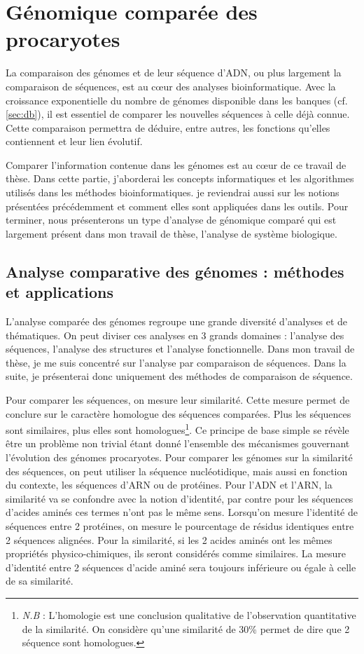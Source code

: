 \chapter{Génomique comparée des procaryotes}
\label{chap:comp}

La comparaison des génomes et de leur séquence d'ADN, ou plus largement la comparaison de séquences, est au c\oe ur des analyses bioinformatique. Avec la croissance exponentielle du nombre de génomes disponible dans les banques (cf. \autoref{sec:db}), il est essentiel de comparer les nouvelles séquences à celle déjà connue. Cette comparaison permettra de déduire, entre autres, les fonctions qu'elles contiennent et leur lien évolutif. 

Comparer l'information contenue dans les génomes est au c\oe ur de ce travail de thèse. Dans cette partie, j'aborderai les concepts informatiques et les algorithmes utilisés dans les méthodes bioinformatiques. je reviendrai aussi sur les notions présentées précédemment et comment elles sont appliquées dans les outils. Pour terminer, nous présenterons un type d'analyse de génomique comparé qui est largement présent dans mon travail de thèse, l'analyse de système biologique.

\section{Analyse comparative des génomes : méthodes et applications}
\label{sec:comp_gen}

L'analyse comparée des génomes regroupe une grande diversité d'analyses et de thématiques. On peut diviser ces analyses en 3 grands domaines : l'analyse des séquences, l'analyse des structures et l'analyse fonctionnelle. Dans mon travail de thèse, je me suis concentré sur l'analyse par comparaison de séquences. Dans la suite, je présenterai donc uniquement des méthodes de comparaison de séquence.

Pour comparer les séquences, on mesure leur similarité. Cette mesure permet de conclure sur le caractère homologue des séquences comparées. Plus les séquences sont similaires, plus elles sont homologues\footnote{\textit{N.B} : L'homologie est une conclusion qualitative de l'observation quantitative de la similarité. On considère qu'une similarité de 30\% permet de dire que 2 séquence sont homologues.}. Ce principe de base simple se révèle être un problème non trivial étant donné l'ensemble des mécanismes gouvernant l'évolution des génomes procaryotes. Pour comparer les génomes sur la similarité des séquences, on peut utiliser la séquence nucléotidique, mais aussi en fonction du contexte, les séquences d'ARN ou de protéines. Pour l'ADN et l'ARN, la similarité va se confondre avec la notion d'identité, par contre pour les séquences d'acides aminés ces termes n'ont pas le même sens. Lorsqu'on mesure l'identité de séquences entre 2 protéines, on mesure le pourcentage de résidus identiques entre 2 séquences alignées. Pour la similarité, si les 2 acides aminés ont les mêmes propriétés physico-chimiques, ils seront considérés comme similaires. La mesure d'identité entre 2 séquences d'acide aminé sera toujours inférieure ou égale à celle de sa similarité.

